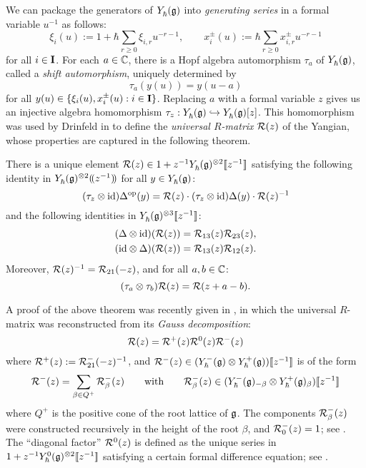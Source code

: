 We can package the generators of $\Yhg$ into \emph{generating series} in a formal variable $u^{-1}$ as follows:
\begin{equation}\label{eqn:gen-series}
    \xi_i(u) := 1+\hbar\sum_{r\geq 0}\xi_{i,r}u^{-r-1}, \qquad x^\pm_i(u) := \hbar\sum_{r\geq 0}x^\pm_{i,r}u^{-r-1}
\end{equation}
for all $i\in\I$.
For each $a\in\C$, there is a Hopf algebra automorphism $\tau_a$ of $\Yhg$, called a \emph{shift automorphism}, uniquely determined by
\[\tau_a(y(u)) = y(u-a)\]
for all $y(u)\in\{\xi_i(u),x^\pm_i(u) : i\in\I\}$.
Replacing $a$ with a formal variable $z$ gives us an injective algebra homomorphism $\tau_z:\Yhg\inj\Yhg[][z]$.
This homomorphism was used by Drinfeld in \cite{drinfeld_hopf_1985} to define the \emph{universal $R$-matrix} $\rmat(z)$ of the Yangian, whose properties are captured in the following theorem.

\begin{theorem}\label{T:R}
    There is a unique element $\rmat(z)\in 1+z^{-1}\Yhg^{\otimes 2}\db{z^{-1}}$ satisfying the following identity in $\Yhg^{\otimes 2}\dparen{z^{-1}}$ for all $y\in\Yhg$:
    \begin{equation}\label{eqn:R-intertwiner}
        (\tau_z\otimes{\id})\Delta^{\mathrm{op}}(y) = \rmat(z) \cdot (\tau_z\otimes{\id})\Delta(y) \cdot \rmat(z)^{-1}
    \end{equation}
    and the following identities in $\Yhg^{\otimes 3}\db{z^{-1}}$:
    \begin{gather*}
        (\Delta\otimes{\id})(\rmat(z)) = \rmat_{13}(z)\rmat_{23}(z), \\
        ({\id}\otimes\Delta)(\rmat(z)) = \rmat_{13}(z)\rmat_{12}(z).
    \end{gather*}
    Moreover, $\rmat(z)^{-1} = \rmat_{21}(-z)$, and for all $a,b\in\C$:
    \[(\tau_a\otimes\tau_b)\rmat(z) = \rmat(z+a-b).\]
\end{theorem}

A proof of the above theorem was recently given in \cite{gautam_meromorphic_2021}, in which the universal $R$-matrix was reconstructed from its \emph{Gauss decomposition}:
\[\rmat(z) = \rmat^+(z)\rmat^0(z)\rmat^-(z)\]
where $\rmat^+(z) := \rmat^-_{21}(-z)^{-1}$, and $\rmat^-(z)\in(\Yhg[-]\otimes\Yhg[+])\db{z^{-1}}$ is of the form
\[\rmat^-(z) = \sum_{\beta\in Q^+}\rmat_\beta^-(z) \qquad\text{with}\qquad \rmat_\beta^-(z) \in(\Yhg[-]_{-\beta}\otimes\Yhg[+]_\beta)\db{z^{-1}}\]
where $Q^+$ is the positive cone of the root lattice of $\g$.
The components $\rmat_\beta^-(z)$ were constructed recursively in the height of the root $\beta$, and $\rmat_0^-(z)=1$; see \cite[\S 4.2]{gautam_meromorphic_2021}.
The ``diagonal factor'' $\rmat^0(z)$ is defined as the unique series in $1+z^{-1}\Yhg[0]^{\otimes 2}\db{z^{-1}}$ satisfying a certain formal difference equation; see \cite[\S6]{gautam_meromorphic_2021}.


